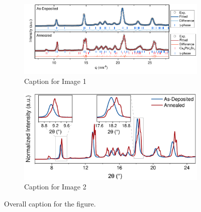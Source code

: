 \begin{figure}[htbp]
    \centering
    \begin{subfigure}[b]{\textwidth}
    \centering
        \includegraphics[width=0.85\linewidth]{chapters/material_properties/images/GIWAXS_Before_After.pdf}
        \caption{Caption for Image 1}
        \label{fig:ch2:giwaxs_before_after:model}
    \end{subfigure}

    \vspace{0.5cm}
    
    \begin{subfigure}[b]{\textwidth}
    \centering
    \hspace{-1.4cm}
        \includegraphics[width=0.68\linewidth]{chapters/material_properties/images/giwaxs_overlayed.pdf}
        \caption{Caption for Image 2}
        \label{fig:ch2:giwaxs_before_after:overlay}
    \end{subfigure}
    
    \caption{Overall caption for the figure.}
    \label{fig:ch2:giwaxs_before_after:}
\end{figure}



